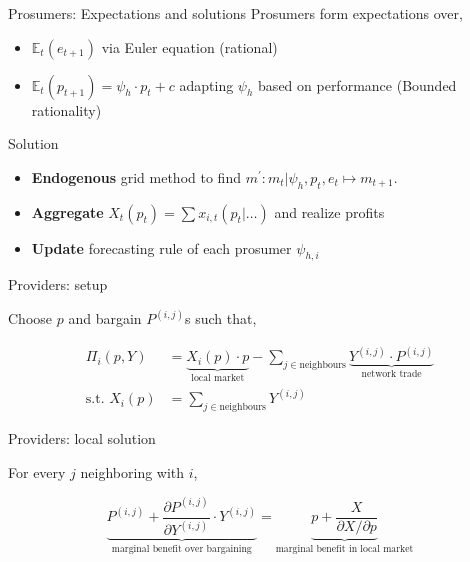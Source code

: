 \documentclass[xcolor={svgnames}]{beamer}
\newcommand{\E}{\mathbb{E}}
\begin{document}
\begin{frame}{Prosumers: Expectations and solutions}
    Prosumers form expectations over,

    \begin{itemize} \setlength{\itemsep}{1em}
        \item $\E_t(e_{t+1})$ via Euler equation (rational)
        \item $\E_t(p_{t+1}) = \psi_h \cdot p_t + c$ adapting $\psi_h$ based on performance (Bounded rationality)
    \end{itemize}

    Solution

    \begin{itemize} \setlength{\itemsep}{1em}
        \item \textbf{Endogenous} grid method to find $m^\prime: m_t \vert \psi_h, p_t, e_t \mapsto m_{t+1}$.
        \item \textbf{Aggregate} $X_t(p_t) = \sum x_{i, t}(p_t \vert \ldots)$ and realize profits
        \item \textbf{Update} forecasting rule of each prosumer $\psi_{h, i}$
    \end{itemize}
\end{frame}

\begin{frame}{Providers: setup}

    Choose $p$ and bargain $P^{(i, j)}$s such that,

    \begin{equation*}
        \begin{split}
            \Pi_i\left(p, Y\right) &= \underbrace{X_i(p) \cdot p}_{\text{local market}} - \sum_{j \in \text{neighbours}} \underbrace{Y^{(i, j)} \cdot P^{(i, j)}}_{\text{network trade}} \\
            \text{s.t. } X_i(p) &=\sum_{j \in \text{neighbours}} Y^{(i, j)}
        \end{split}
    \end{equation*}
\end{frame}


\begin{frame}{Providers: local solution}

    For every $j$ neighboring with $i$,

    \begin{equation*}
        \underbrace{P^{(i, j)}+ \frac{\partial P^{(i, j)}}{\partial Y^{(i, j)}} \cdot Y^{(i, j)}}_{\text{marginal benefit over bargaining}} = \underbrace{p + \frac{X}{\partial X / \partial p} }_{\text{marginal benefit in local market}}
    \end{equation*}

\end{frame}
\end{document}
